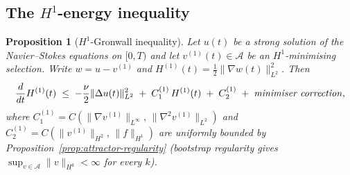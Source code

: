 \documentclass[12pt,a4paper]{article}
\theoremstyle{definition}
\theoremstyle{plain}
\newtheorem{proposition}[definition]{Proposition}
\theoremstyle{remark}
\begin{document}
\subsection{The $H^1$-energy inequality}

\begin{proposition}[$H^1$-Gronwall inequality]\label{prop:H1-Gronwall}
Let $u(t)$ be a strong solution of the Navier--Stokes equations
on $[0,T)$ and let $v^{(1)}(t) \in \mathcal{A}$ be an $H^1$-minimising
selection.  Write $w = u - v^{(1)}$ and
$H^{(1)}(t) = \tfrac{1}{2}\|\nabla w(t)\|_{L^2}^2$.  Then
\begin{equation}\label{eq:H1-ineq}
  \frac{d}{dt}H^{(1)}(t)
  \;\le\;
  -\frac{\nu}{2}\|\Delta u(t)\|_{L^2}^2
  \;+\; C_1^{(1)}\,H^{(1)}(t)
  \;+\; C_2^{(1)}
  \;+\; \text{\emph{minimiser correction}},
\end{equation}
where
$C_1^{(1)} = C(\|\nabla v^{(1)}\|_{L^\infty},\,
\|\nabla^2 v^{(1)}\|_{L^2})$ and
$C_2^{(1)} = C(\|v^{(1)}\|_{H^2},\,\|f\|_{H^1})$ are
uniformly bounded by Proposition~\ref{prop:attractor-regularity}
(bootstrap regularity gives $\sup_{v \in \mathcal{A}}\|v\|_{H^k}
< \infty$ for every $k$).
\end{proposition}
\end{document}
